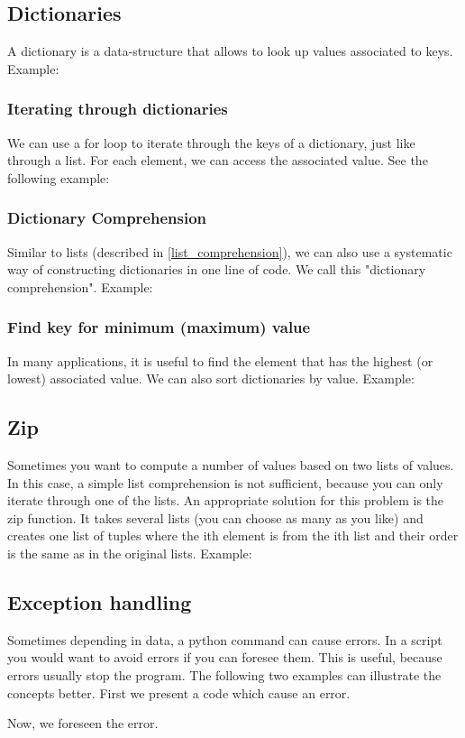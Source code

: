 \documentclass[10pt,a4paper]{article}
\begin{document}
\subsection{Dictionaries}
A dictionary is a data-structure that allows to look up values associated to keys. Example:

\subsubsection{Iterating through dictionaries}
We can use a for loop to iterate through the keys of a dictionary, just like through a list. For each element, we can access the associated value. See the following example:

\subsubsection{Dictionary Comprehension}
Similar to lists (described in \ref{list_comprehension}), we can also use a systematic way of constructing dictionaries in one line of code. We call this "dictionary comprehension". Example:

\subsubsection{Find key for minimum (maximum) value}
In many applications, it is useful to find the element that has the highest (or lowest) associated value. We can also sort dictionaries by value. Example:



\subsection{Zip}
Sometimes you want to compute a number of values based on two lists of values. In this case, a simple list comprehension is not sufficient, because you can only iterate through one of the lists. An appropriate solution for this problem is the zip function. It takes several lists (you can choose as many as you like) and creates one list of tuples where the ith element is from the ith list and their order is the same as in the original lists. Example:

\subsection{Exception handling}
Sometimes depending in data, a python command can cause errors. In a script you would want to avoid errors if you can foresee them. This is useful, because errors usually stop the program. The following two examples  can illustrate the concepts better. First we present a code which cause an error.

Now, we foreseen the error.

\end{document}
